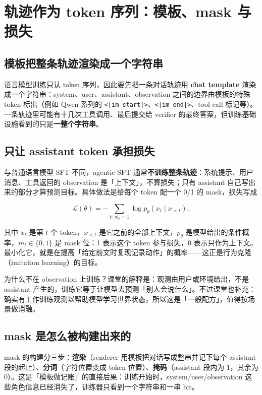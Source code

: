 \documentclass[a4paper]{article}
\begin{document}
\section{轨迹作为 token 序列：模板、mask 与损失}

\subsection{模板把整条轨迹渲染成一个字符串}

语言模型训练只认 token 序列，因此要先把一条对话轨迹用 \textbf{chat template} 渲染成一个字符串：system、user、assistant、observation 之间的边界由模板的特殊 token 标出（例如 Qwen 系列的 \texttt{<|im\_start|>}、\texttt{<|im\_end|>}、tool call 标记等）。一条轨迹里可能有十几次工具调用、最后提交给 verifier 的最终答案，但训练基础设施看到的只是\textbf{一整个字符串}。

\subsection{只让 assistant token 承担损失}

与普通语言模型 SFT 不同，agentic SFT 通常\textbf{不训练整条轨迹}：系统提示、用户消息、工具返回的 observation 是「上下文」，不算损失；只有 assistant 自己写出来的部分才算预测目标。具体做法是给每个 token 配一个 0/1 的 mask，损失写成

$$
\mathcal{L}(\theta) = -\sum_{t:\, m_t=1} \log p_\theta(x_t \mid x_{<t}),
$$

其中 $x_t$ 是第 $t$ 个 token，$x_{<t}$ 是它之前的全部上下文，$p_\theta$ 是模型给出的条件概率，$m_t\in\{0,1\}$ 是 mask 位：1 表示这个 token 参与损失，0 表示只作为上下文。最小化它，就是在提高「给定前文时复现记录动作」的概率——这正是行为克隆（imitation learning）的目标。

为什么不在 observation 上训练？课堂的解释是：观测由用户或环境给出，不是 assistant 产生的，训练它等于让模型去预测「别人会说什么」。不过课堂也补充：确实有工作训练观测以帮助模型学习世界状态，所以这是「一般配方」，值得按场景做消融。

\subsection{mask 是怎么被构建出来的}

mask 的构建分三步：\textbf{渲染}（renderer 用模板把对话写成整串并记下每个 assistant 段的起止）、\textbf{分词}（字符位置变成 token 位置）、\textbf{掩码}（assistant 段内为 1，其余为 0）。这是「模板做记账」的直接后果：训练开始时，system/user/observation 这些角色信息已经消失了，训练器只看到一个字符串和一串 bit。
\end{document}
